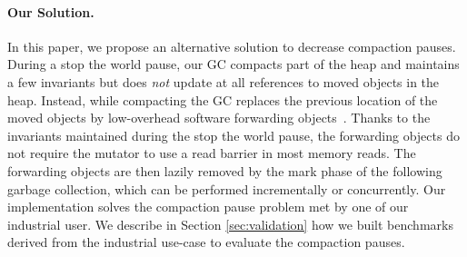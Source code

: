 \documentclass[sigplan,10pt,review,anonymous]{acmart}\settopmatter{printfolios=true,printccs=false,printacmref=false}
\begin{document}



\paragraph{Our Solution.} 
In this paper, we propose an alternative solution to decrease compaction pauses. During a stop the world pause, our GC compacts part of the heap and maintains a few invariants but does \emph{not} update at all references to moved objects in the heap. Instead, while compacting the GC replaces the previous location of the moved objects by low-overhead software forwarding objects~\cite{Forwarders}. Thanks to the invariants maintained during the stop the world pause, the forwarding objects do not require the mutator to use a read barrier in most memory reads. The forwarding objects are then lazily removed by the mark phase of the following garbage collection, which can be performed incrementally or concurrently. Our implementation solves the compaction pause problem met by one of our industrial user. We describe in Section \ref{sec:validation} how we built benchmarks derived from the industrial use-case to evaluate the compaction pauses. %
\end{document}
